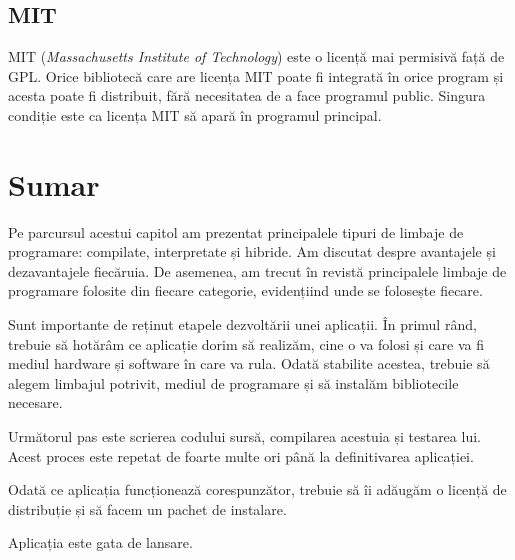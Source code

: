 \subsection{MIT}
\label{sec:appdev-licensing-mit}

MIT  (\textit{Massachusetts Institute of Technology}) este o licență mai permisivă față de GPL.
Orice bibliotecă care are licența MIT poate fi integrată în orice program și acesta poate fi distribuit, fără necesitatea de a face programul public.
Singura condiție este ca licența MIT să apară în programul principal.

\section{Sumar}
\label{sec:appdev-summary}

Pe parcursul acestui capitol am prezentat principalele tipuri de limbaje de programare: compilate, interpretate și hibride.
Am discutat despre avantajele și dezavantajele fiecăruia.
De asemenea, am trecut în revistă principalele limbaje de programare folosite din fiecare categorie, evidențiind unde se folosește fiecare.

Sunt importante de reținut etapele dezvoltării unei aplicații.
În primul rând, trebuie să hotărâm ce aplicație dorim să realizăm, cine o va folosi și care va fi mediul hardware și software în care va rula.
Odată stabilite acestea, trebuie să alegem limbajul potrivit, mediul de programare și să instalăm bibliotecile necesare.

Următorul pas este scrierea codului sursă, compilarea acestuia și testarea lui.
Acest proces este repetat de foarte multe ori până la definitivarea aplicației.

Odată ce aplicația funcționează corespunzător, trebuie să îi adăugăm o licență de distribuție și să facem un pachet de instalare.

Aplicația este gata de lansare.
